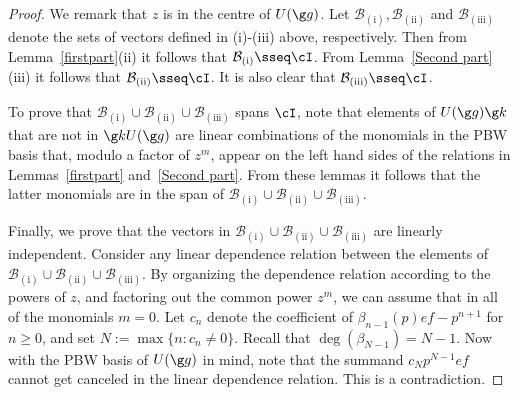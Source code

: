 \documentclass[11pt]{amsart}
\begin{document}
\begin{proof}
We remark that $z$ is in the centre of $U(\g g)$.
Let $\mathcal B_\mathrm{(i)},\mathcal B_\mathrm{(ii)}$
and 
$\mathcal B_\mathrm{(iii)}$ denote the sets of vectors defined in (i)-(iii) above, respectively. Then from Lemma~\ref{firstpart}(ii) it follows that $\mathcal B_\mathrm{(i)}\sseq \cI$. From Lemma~\ref{Second part}(iii) it follows that $\mathcal B_\mathrm{(ii)}\sseq \cI$. It is also clear that $\mathcal B_\mathrm{(iii)}\sseq\cI$.  

To prove that $\mathcal B_\mathrm{(i)}\cup\mathcal B_\mathrm{(ii)}\cup\mathcal B_\mathrm{(iii)}$ spans $\cI$, note that elements of $U(\g g)\g k$ that are not in $\g kU(\g g)$ are linear combinations of the
 monomials in the PBW basis that, modulo a factor of $z^m$,  appear on  the left hand sides of the relations in Lemmas~\ref{firstpart} and~\ref{Second part}. 
From these lemmas it follows that the latter monomials are in the span of $\mathcal B_\mathrm{(i)}\cup\mathcal B_\mathrm{(ii)}\cup\mathcal B_\mathrm{(iii)}$.

Finally, we prove that the vectors
in $\mathcal B_\mathrm{(i)}\cup\mathcal B_\mathrm{(ii)}\cup\mathcal B_\mathrm{(iii)}$
 are linearly independent. Consider any  linear dependence relation between the elements of 
$\mathcal B_\mathrm{(i)}\cup\mathcal B_\mathrm{(ii)}\cup\mathcal B_\mathrm{(iii)}$.  
By organizing the dependence relation according to the powers of $z$, and factoring out the common power $z^m$, we can assume that in all of the monomials $m=0$. 
  Let $c_n$ denote the coefficient of $\beta_{n-1}(p)ef-p^{n+1}$ for $n\geq 0$, and set $N:=\max\{n:c_n\neq 0\}$. Recall that $\deg(\beta_{N-1})=N-1$. Now with the PBW basis of $U(\g g)$ in mind, note that the summand $c_Np^{N-1}ef$ cannot get canceled in the linear dependence relation. This is a contradiction. 
\end{proof}




\end{document}
